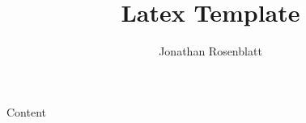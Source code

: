 \documentclass[12pt,a4paper]{article}
\author{Jonathan Rosenblatt}
\title{Latex Template}
\begin{document}
\maketitle

\tableofcontents

Content





\newpage


\label{sec:bibliography}
\end{document}
